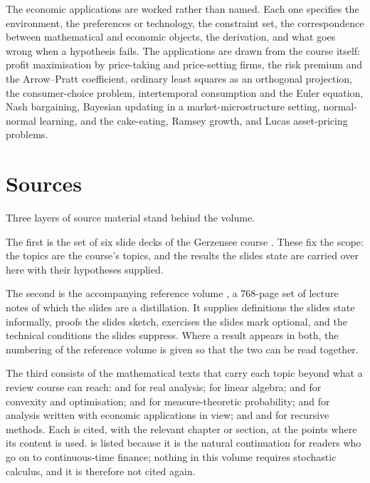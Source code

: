 The economic applications are worked rather than named. Each one specifies the
environment, the preferences or technology, the constraint set, the
correspondence between mathematical and economic objects, the derivation, and
what goes wrong when a hypothesis fails.
The applications are drawn from the course itself: profit maximisation by
price-taking and price-setting firms, the risk premium and the Arrow--Pratt
coefficient, ordinary least squares as an orthogonal projection, the
consumer-choice problem, intertemporal consumption and the Euler equation, Nash
bargaining, Bayesian updating in a market-microstructure setting, normal-normal
learning, and the cake-eating, Ramsey growth, and Lucas asset-pricing problems.

\section*{Sources}

Three layers of source material stand behind the volume.

The first is the set of six slide decks of the Gerzensee course
\autocite{fukuda2026probability,fukuda2026calculus,fukuda2026optimization,%
fukuda2026analysis,fukuda2026dynamic,fukuda2026logistics}. These fix the scope:
the topics are the course's topics, and the results the slides state are carried
over here with their hypotheses supplied.

The second is the accompanying reference volume
\autocite{fukuda2026notes}, a 768-page set of lecture notes of which the slides
are a distillation. It supplies definitions the slides state informally, proofs
the slides sketch, exercises the slides mark optional, and the technical
conditions the slides suppress. Where a result appears in both, the numbering of
the reference volume is given so that the two can be read together.

The third consists of the mathematical texts that carry each topic beyond
what a review course can reach:
\textcite{rudin1976principles} and \textcite{amann2005analysisI,%
amann2008analysisII,amann2009analysisIII} for real analysis;
\textcite{axler2024linear} for linear algebra;
\textcite{boyd2004convex} and \textcite{rockafellar1970convex} for convexity and
optimisation; \textcite{legall2022measure} and \textcite{legall2016brownian} for
measure-theoretic probability; \textcite{corbae2009introduction} and
\textcite{ok2007real} for analysis written with economic applications in view;
and \textcite{ljungqvist2018recursive} and \textcite{stokey1989recursive} for
recursive methods. Each is cited, with the relevant chapter or section, at the
points where its content is used. \textcite{legall2016brownian} is listed
because it is the natural continuation for readers who go on to
continuous-time finance; nothing in this volume requires stochastic calculus,
and it is therefore not cited again.

